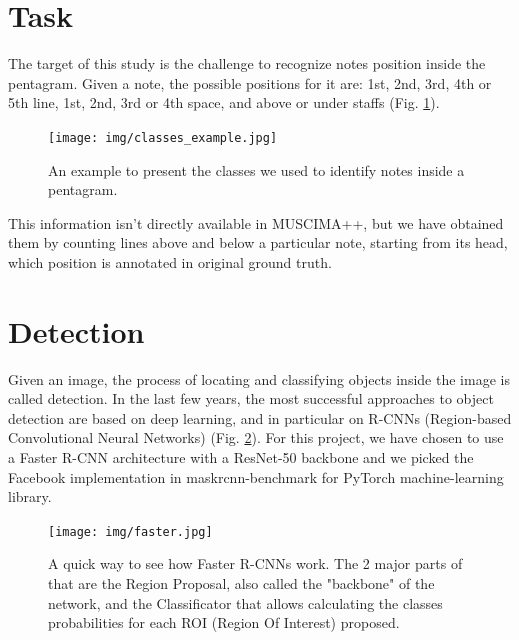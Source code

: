 \documentclass[journal]{IEEEtran}
\begin{document}
	\section{Task}
	The target of this study is the challenge to recognize notes position inside the pentagram. Given a note, the possible positions for it are: 1st, 2nd, 3rd, 4th or 5th line, 1st, 2nd, 3rd or 4th space, and above or under staffs (Fig. \ref{fig:classes_example}). 
	\\
	\begin{figure} [h]
		\begin{center}
			\texttt{[image: img/classes\_example.jpg]}\\
			\caption{An example to present the classes we used to identify notes inside a pentagram.}
			\label{fig:classes_example}
		\end{center}
	\end{figure}

	This information isn't directly available in MUSCIMA++, but we have obtained them by counting lines above and below a particular note, starting from its head, which position is annotated in original ground truth.
	
	\section{Detection}
	Given an image, the process of locating and classifying objects inside the image is called detection. In the last few years, the most successful approaches to object detection are based on deep learning, and in particular on R-CNNs (Region-based Convolutional Neural Networks) \cite{OMR-Baseline} (Fig. \ref{fig:faster}). For this project, we have chosen to use a Faster R-CNN architecture with a ResNet-50 \cite{RESNET} backbone and we picked the Facebook implementation in maskrcnn-benchmark \cite{mask-LINK} for PyTorch machine-learning library.
	
	\begin{figure} [h]
		\begin{center}
			\texttt{[image: img/faster.jpg]}\\
			\caption{A quick way to see how Faster R-CNNs work. The 2 major parts of that are the Region Proposal, also called the "backbone" of the network, and the Classificator that allows calculating the classes probabilities for each ROI (Region Of Interest) proposed.}
			\label{fig:faster}
		\end{center}
	\end{figure}
	
\end{document}
